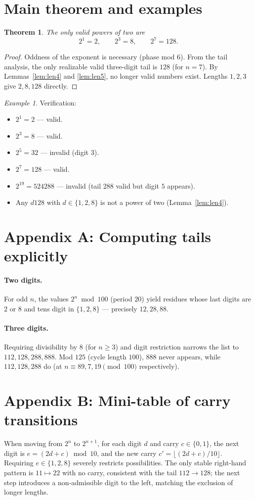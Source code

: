 \documentclass[12pt]{article}
\theoremstyle{plain}
\newtheorem{theorem}{Theorem}
\theoremstyle{remark}
\newtheorem*{example}{Example}
\begin{document}
\section{Main theorem and examples}
\begin{theorem}
The only valid powers of two are
\[
2^1=2,\qquad 2^3=8,\qquad 2^7=128.
\]
\end{theorem}

\begin{proof}
Oddness of the exponent is necessary (phase mod 6).  
From the tail analysis, the only realizable valid three-digit tail is $128$ (for $n=7$).  
By Lemmas~\ref{lem:len4} and \ref{lem:len5}, no longer valid numbers exist.  
Lengths $1,2,3$ give $2,8,128$ directly.
\end{proof}

\begin{example}
Verification:
\begin{itemize}[nosep]
\item $2^1=2$ — valid.
\item $2^3=8$ — valid.
\item $2^5=32$ — invalid (digit $3$).
\item $2^7=128$ — valid.
\item $2^{19}=524288$ — invalid (tail $288$ valid but digit $5$ appears).
\item Any $d128$ with $d\in\{1,2,8\}$ is not a power of two (Lemma~\ref{lem:len4}).
\end{itemize}
\end{example}

\section*{Appendix A: Computing tails explicitly}
\paragraph{Two digits.}  
For odd $n$, the values $2^n\bmod100$ (period $20$) yield residues whose last digits are $2$ or $8$ and tens digit in $\{1,2,8\}$ — precisely $12,28,88$.

\paragraph{Three digits.}  
Requiring divisibility by $8$ (for $n\ge3$) and digit restriction narrows the list to $112,128,288,888$.  
Mod $125$ (cycle length $100$), $888$ never appears, while $112,128,288$ do (at $n\equiv89,7,19\pmod{100}$ respectively).

\section*{Appendix B: Mini-table of carry transitions}
When moving from $2^n$ to $2^{n+1}$, for each digit $d$ and carry $c\in\{0,1\}$, the next digit is
$e=(2d+c)\bmod10$, and the new carry $c'=\lfloor(2d+c)/10\rfloor$.  
Requiring $e\in\{1,2,8\}$ severely restricts possibilities.  
The only stable right-hand pattern is $11\mapsto22$ with no carry, consistent with the tail $112\to128$; the next step introduces a non-admissible digit to the left, matching the exclusion of longer lengths.
\end{document}
